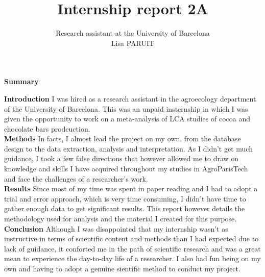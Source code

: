 \documentclass{article}
\title{\sffamily\LARGE\bfseries Internship report 2A}
\author{\sffamily Research assistant at the University of Barcelona
  \\Lisa PARUIT}
\date{}
\begin{document}
\maketitle

\renewenvironment{abstract}
{\begin{center}\textbf{Summary}\end{center}}{}

\begin{abstract}
  \noindent \textbf{Introduction} I was hired as a research assistant in the
  agroecology department of the University of Barcelona. This was an unpaid
  insternship in which I was given the opportunity to work on a meta-analysis
  of
  LCA studies of cocoa and chocolate bars prodcuction.\\
  \textbf{Methods} In facts, I almost lead the project on my own, from the
  database design to the data extraction, analysis and interpretation. As I
  didn't get much guidance, I took a few false directions that however allowed
  me
  to draw on knowledge and skills I have acquired throughout my studies in
  AgroParisTech and face the challenges of a researcher's work.\\
  \textbf{Results} Since most of my time was spent in paper reading and I had
  to adopt a trial and error approach, which is very time consuming, I didn't
  have time to gather enough data to get significant results. This report
  however
  details the methodology used for analysis and the material I created for this
  purpose.\\
  \textbf{Conclusion} Although I was disappointed that my internship wasn't as
  instructive in terms of scientific content and methods than I had expected due
  to
  lack of guidance, it conforted me in the path of scientific research and was 
  a great mean
  to experience the day-to-day life of a researcher. I also had fun being on my
  own and having to adopt a genuine sientific method to conduct my project.
\end{abstract}

\renewenvironment{abstract}
{\begin{center}\textbf{Résumé}\end{center}}{}
\end{document}
